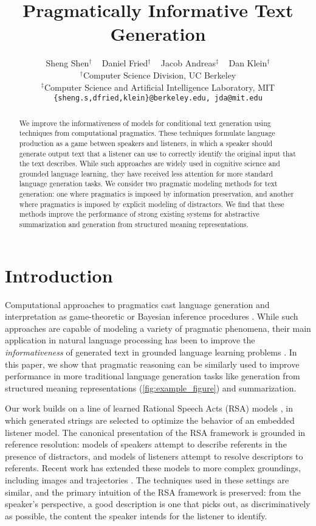 \documentclass[11pt,a4paper]{article}
\title{Pragmatically Informative Text Generation}
\author{Sheng Shen$^\dagger$ ~ Daniel Fried$^\dagger$ ~ Jacob Andreas$^\ddagger$ ~ Dan Klein$^\dagger$ \\
$^\dagger$Computer Science Division, UC Berkeley\\ 
$^\ddagger$Computer Science and Artificial Intelligence Laboratory, MIT \\
{\tt \{sheng.s,dfried,klein\}@berkeley.edu, jda@mit.edu}  \\
}
\date{}
\begin{document}
\allowdisplaybreaks


\maketitle
\begin{abstract}
We improve the informativeness of models for conditional text generation using techniques from computational pragmatics. These techniques formulate language production as a game between speakers and listeners, in which a speaker should generate output text that a listener can use to correctly identify the original input that the text describes. While such approaches are widely used in cognitive science and grounded language learning, they have received less attention for more standard language generation tasks.  We consider two pragmatic modeling methods for text generation: one where pragmatics is imposed by information preservation, and another where pragmatics is imposed by explicit modeling of distractors. We find that these methods improve the performance of strong existing systems for abstractive summarization and generation from structured meaning representations.
%
 \end{abstract}


\section{Introduction}


Computational approaches to pragmatics cast
language generation and interpretation as game-theoretic or
Bayesian
inference procedures \cite{Golland10Game,frank2012predicting}.
While such approaches are capable of modeling a variety of pragmatic phenomena,
their main application in natural language processing has been to
improve the \emph{informativeness} of generated text in grounded language learning problems \cite{monroe2018bilingual}.
In this paper, we show that pragmatic reasoning can be similarly used to improve performance
in more traditional language generation tasks like generation
from structured meaning representations (\autoref{fig:example_figure})
and summarization.

Our work builds on a line of learned Rational Speech Acts (RSA) models
\cite{Monroe15RationalSpeech,Andreas16Pragmatics}, in which generated strings
are selected to optimize the behavior of an embedded listener model. The
canonical presentation of the RSA framework \cite{frank2012predicting} is
grounded in reference resolution: models of speakers attempt to describe
referents in the presence of distractors, and models of listeners attempt to
resolve descriptors to referents. Recent work has extended these models to more complex groundings, including images
\cite{Mao15Generation} and trajectories
\cite{fried2017unified}. The techniques used in these settings are similar, and
the primary intuition
of the RSA framework is preserved: from the speaker's perspective, a good
description is one that picks out, as discriminatively as possible, the content
the speaker intends for the listener to identify.
\end{document}
